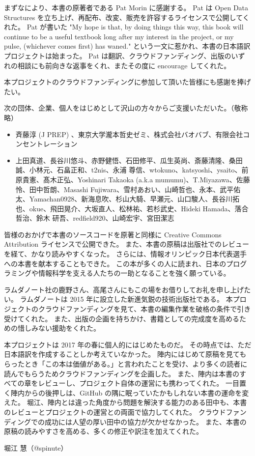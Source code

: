 まずなにより、本書の原著者である Pat Morin に感謝する。
Pat は Open Data Structures を立ち上げ、再配布、改変、販売を許容するライセンスで公開してくれた。
Pat が書いた "My hope is that, by doing things this way, this book will continue to be a useful textbook long after my interest in the project, or my pulse, (whichever comes first) has waned." という一文に惹かれ、本書の日本語訳プロジェクトは始まった。
Pat は翻訳、クラウドファンディング、出版のいずれの相談にも前向きな返事をくれ、またその度に encourage してくれた。

本プロジェクトのクラウドファンディングに参加して頂いた皆様にも感謝を捧げたい。

次の団体、企業、個人をはじめとして沢山の方々からご支援いただいた。（敬称略） %
\begin{itemize}
\item 斉藤淳 (J PREP) 、東京大学瀧本哲史ゼミ、株式会社バオバブ、有限会社コンセントレーション
\item 上田真道、長谷川悠斗、赤野健悟、石田修平、瓜生英尚、斎藤清隆、桑田誠、小林元、石畠正和、t2nis、永浦 尊信、wtokuno、katsyoshi、ysaito、前原貴憲、髙木正弘、Yoshinari Takaoka (a.k.a mumumu)、T.Miyazawa、佐藤怜、田中哲朗、Masashi Fujiwara、雪村あおい、山崎哲也、永本、武平佑太、Yamachan0928、新海息吹、杉山大騎、早瀬元、山口駿人、長谷川拓也、okue、飛田晃介、大坂直人、松林祐、若杉武史、Hideki Hamada、落合哲治、鈴木 研吾、redfield920、山崎宏宇、宮田潔志
\end{itemize}

皆様のおかげで本書のソースコードを原著と同様に Creative Commons Attribution ライセンスで公開できた。
また、本書の原稿は出版社でのレビューを経て、かなり読みやすくなった。
さらには、情報オリンピック日本代表選手への本書を献本することもできた。
この本が多くの人に読まれ、日本のプログラミングや情報科学を支える人たちの一助となることを強く願っている。

ラムダノート社の鹿野さん、高尾さんにもこの場をお借りしてお礼を申し上げたい。
ラムダノートは 2015 年に設立した新進気鋭の技術出版社である。
本プロジェクトのクラウドファンディングを見て、本書の編集作業を破格の条件で引き受けてくれた。
また、出版の企画を持ちかけ、書籍としての完成度を高めるための惜しみない援助をくれた。

本プロジェクトは 2017 年の春に個人的にはじめたものだ。
その時点では、ただ日本語訳を作成することしか考えていなかった。
陣内にはじめて原稿を見てもらったとき「この本は価値がある。」と言われたことを受け、より多くの読者に読んでもらうためクラウドファンディングを企画した。
また、陣内は本書のすべての章をレビューし、プロジェクト自体の運営にも携わってくれた。
一目置く陣内からの後押しは、GitHub の隅に眠っていたかもしれない本書の運命を変えた。
堀江、陣内とは違った角度から問題を解決する能力のある田中も、本書のレビューとプロジェクトの運営との両面で協力してくれた。
クラウドファンディングでの成功には人望の厚い田中の協力が欠かせなかった。
また、本書の原稿の読みやすさを高める、多くの修正や訳注を加えてくれた。

堀江 慧（@spinute）
